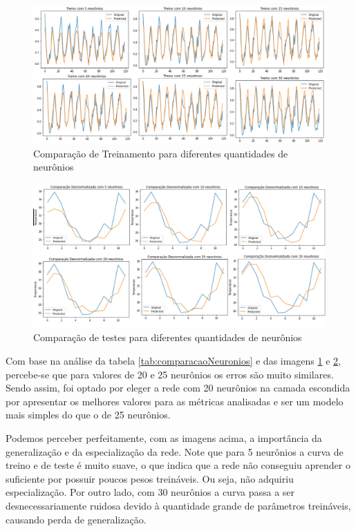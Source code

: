 \documentclass[12pt]{article}
\begin{document}
	\begin{figure}[H]
		\centering
		\includegraphics[width=0.9\linewidth]{Imagens/onestep/treinocomparadoneuronios}
		\caption{Comparação de Treinamento para diferentes quantidades de neurônios}
		\label{fig:treinocomparadoneuronios}
	\end{figure}
	\begin{figure}[H]
		\centering
		\includegraphics[width=0.9\linewidth]{Imagens/onestep/comparacaoneuronios.jpg}
		\caption{Comparação de testes para diferentes quantidades de neurônios}
		\label{fig:comparacaoneuronios}
	\end{figure}

	Com base na análise da tabela \ref{tab:comparacaoNeuronios} e das imagens \ref{fig:treinocomparadoneuronios} e \ref{fig:comparacaoneuronios}, percebe-se que para valores de 20 e 25 neurônios os erros são muito similares. Sendo assim, foi optado por eleger a rede com 20 neurônios na camada escondida por apresentar os melhores valores para as métricas analisadas e ser um modelo mais simples do que o de 25 neurônios.
	
	Podemos perceber perfeitamente, com as imagens acima, a importância da generalização e da especialização da rede. Note que para 5 neurônios a curva de treino e de teste é muito suave, o que indica que a rede não conseguiu aprender o suficiente por possuir poucos pesos treináveis. Ou seja, não adquiriu especialização. Por outro lado, com 30 neurônios a curva passa a ser desnecessariamente ruidosa devido à quantidade grande de parâmetros treináveis, causando perda de generalização.
	
\end{document}
